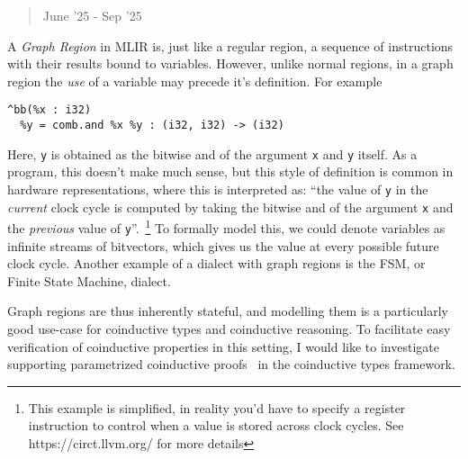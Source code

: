 \documentclass[a4paper]{scrartcl}
\begin{document}
\begin{quote}
June '25 - Sep '25
\end{quote}

A \emph{Graph Region} in MLIR is, just like a regular region, a sequence
of instructions with their results bound to variables. However, unlike
normal regions, in a graph region the \emph{use} of a variable may
precede it's definition. For example

\begin{verbatim}
^bb(%x : i32)
  %y = comb.and %x %y : (i32, i32) -> (i32)
\end{verbatim}

Here, \texttt{y} is obtained as the bitwise and of the argument
\texttt{x} and \texttt{y} itself. As a program, this doesn't make much
sense, but this style of definition is common in hardware
representations, where this is interpreted as: ``the value of \texttt{y}
in the \emph{current} clock cycle is computed by taking the bitwise and
of the argument \texttt{x} and the \emph{previous} value of \texttt{y}''.~\footnote{
  This example is simplified, in reality you'd have to specify a
  register instruction to control when a value is stored across clock
  cycles. See https://circt.llvm.org/ for more details}
To formally model this, we could denote variables as infinite streams of bitvectors,
which gives us the value at every possible future clock cycle. Another
example of a dialect with graph regions is the FSM, or Finite State
Machine, dialect.

Graph regions are thus inherently stateful, and modelling them is a
particularly good use-case for coinductive types and coinductive
reasoning. To facilitate easy verification of coinductive properties in
this setting, I would like to investigate supporting parametrized
coinductive proofs~\cite{hurPowerParameterizationCoinductive} in
the coinductive types framework.


\end{document}
